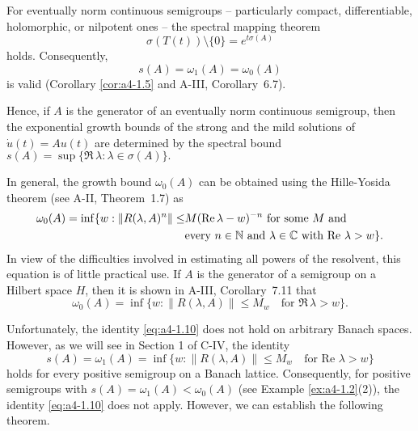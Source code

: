 \begin{remark}\label{rem:a4-1.7}
For eventually norm continuous semigroups -- particularly compact, differentiable, holomorphic, or nilpotent ones -- the spectral mapping theorem 
\begin{equation}\label{eq:a4-1.7}
\sigma(T(t)) \setminus \{0\} = e^{t \sigma(A)}
\end{equation}
holds. 
Consequently,
\begin{equation}\label{eq:a4-1.8}
s(A) = \omega_1(A) = \omega_0(A)
\end{equation}
    is valid (Corollary \ref{cor:a4-1.5} and A-III, Corollary~6.7).

\noindent Hence, if $A$ is the generator of an eventually norm continuous semigroup, then the exponential growth bounds of the strong and the mild solutions of \quad $\dot{u}(t) = A u(t)$ \quad are determined by the spectral bound
\(s(A) = \sup\{\Re\,\lambda : \lambda \in \sigma(A)\}.\)
\end{remark}
\begin{remark} In general, the growth bound $\omega_0(A)$ can be obtained using the Hille-Yosida theorem (see A-II, Theorem~1.7) as
\begin{align}\label{eq:a4-1.9}
\omega_0(A) = \inf \{ w : \|R(\lambda, A)^n\| \leq &M ( \Re\,\lambda - w)^{-n} \text{ for some } M \text{ and}\\
&\text{every } n \in \mathbb{N} \text{ and } \lambda \in \mathbb{C} \text{ with } \text{Re } \lambda > w\}.\notag
\end{align}
\noindent In view of the difficulties involved in estimating all powers of the resolvent, this equation is of little practical use. 
If $A$ is the generator of a semigroup on a Hilbert space $H$, then it is shown in A-III, Corollary~7.11 that
\begin{equation}\label{eq:a4-1.10}
 \omega_0(A) = \inf \{ w : \| R(\lambda, A) \| \leq M_w \quad \text{for } \Re\,\lambda > w \}.
\end{equation}
\end{remark}
\noindent Unfortunately, the identity \eqref{eq:a4-1.10} does not hold on arbitrary Banach spaces. 
However, as we will see in Section 1 of C-IV, the identity 
\begin{equation}\label{eq:a4-1.11}
 s(A)=\omega_1(A) = \inf \{ w : \| R(\lambda, A) \| \leq M_w \quad \text{for } \text{Re } \lambda > w \}
\end{equation}
\noindent holds for every positive semigroup on a Banach lattice. 
Consequently, for positive semigroups with $s(A) = \omega_1(A) < \omega_0(A)$ (see Example \ref{ex:a4-1.2}(2)), the identity \eqref{eq:a4-1.10} does not apply. 
However, we can establish the following theorem.

